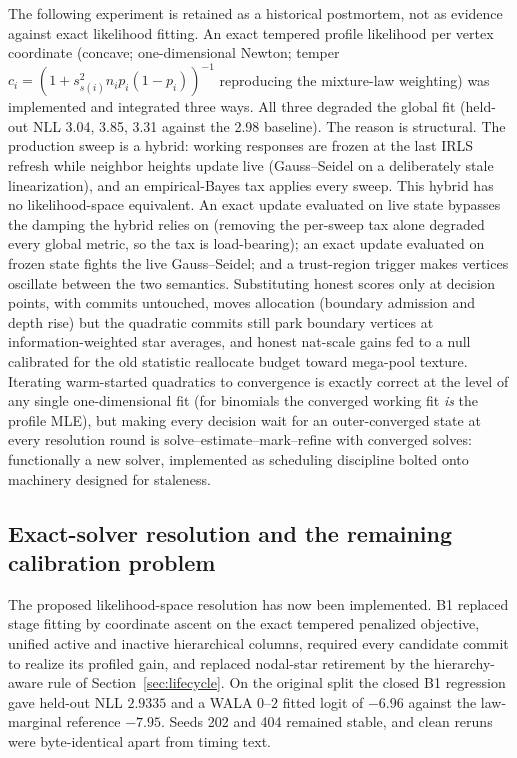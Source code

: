 \documentclass[11pt]{article}
\begin{document}
The following experiment is retained as a historical postmortem, not as evidence against exact
likelihood fitting. An exact tempered profile likelihood per vertex coordinate (concave;
one-dimensional Newton; temper $c_i = (1+s^2_{s(i)} n_i p_i(1-p_i))^{-1}$
reproducing the mixture-law weighting) was implemented and integrated
three ways. All three degraded the global fit (held-out NLL 3.04,
3.85, 3.31 against the 2.98 baseline). The reason is structural. The
production sweep is a hybrid: working responses are frozen at the last
IRLS refresh while neighbor heights update live (Gauss--Seidel on a
deliberately stale linearization), and an empirical-Bayes tax applies
every sweep. This hybrid has no likelihood-space equivalent. An exact
update evaluated on live state bypasses the damping the hybrid relies
on (removing the per-sweep tax alone degraded every global metric,
so the tax is load-bearing); an exact update evaluated on frozen
state fights the live Gauss--Seidel; and a trust-region trigger makes
vertices oscillate between the two semantics. Substituting honest
scores only at decision points, with commits untouched, moves
allocation (boundary admission and depth rise) but the quadratic
commits still park boundary vertices at information-weighted star
averages, and honest nat-scale gains fed to a null calibrated for the
old statistic reallocate budget toward mega-pool texture. Iterating
warm-started quadratics to convergence is exactly correct at the level
of any single one-dimensional fit (for binomials the converged working
fit \emph{is} the profile MLE), but making every decision wait for an
outer-converged state at every resolution round is
solve--estimate--mark--refine with converged solves: functionally a
new solver, implemented as scheduling discipline bolted onto machinery
designed for staleness.

\subsection{Exact-solver resolution and the remaining calibration problem}

The proposed likelihood-space resolution has now been implemented. B1 replaced stage fitting by
coordinate ascent on the exact tempered penalized objective, unified active and inactive hierarchical
columns, required every candidate commit to realize its profiled gain, and replaced nodal-star
retirement by the hierarchy-aware rule of Section~\ref{sec:lifecycle}. On the original split the
closed B1 regression gave held-out NLL $2.9335$ and a WALA $0$--$2$ fitted logit of $-6.96$ against
the law-marginal reference $-7.95$. Seeds 202 and 404 remained stable, and clean reruns were
byte-identical apart from timing text.
\end{document}
